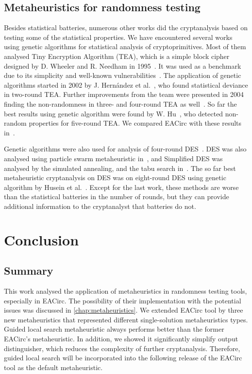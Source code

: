 \documentclass[
    digital,    %
    oneside,    %
    color,
    11pt,
    nocover,
    notable,
    nolof,
    nolot,
]{fithesis3}
\begin{document}
\section{Metaheuristics for randomness testing}
\label{sec:relatwork-paper}

Besides statistical batteries, numerous other works did the cryptanalysis based on testing some of the statistical properties. We have encountered several works using genetic algorithms for statistical analysis of cryptoprimitives. Most of them analysed Tiny Encryption Algorithm (TEA), which is a simple block cipher designed by D. Wheeler and R. Needham in 1995~\cite{TEA}. It was used as a benchmark due to its simplicity and well-known vulnerabilities~\cite{TEAAttack}. The application of genetic algorithms started in 2002 by J. Hernández et al.~\cite{twoRoundsTea}, who found statistical deviance in two-round TEA. Further improvements from the team were presented in 2004 finding the non-randomness in three- and four-round TEA as well~\cite{fourRoundsTea}. So far the best results using genetic algorithm were found by W. Hu~\cite{fiveRoundsTea}, who detected non-random properties for five-round TEA. We compared EACirc with these results in~\cite{kubicek2016new}.

Genetic algorithms were also used for analysis of four-round DES~\cite{song2007cryptanalysis}. DES was also analysed using particle swarm metaheuristic in~\cite{shahzad2009cryptanalysis}, and Simplified DES was analysed by the simulated annealing, and the tabu search in~\cite{nalini2005cryptanalysis}. The so far best metaheuristic cryptanalysis on DES was on eight-round DES using genetic algorithm by Husein et al.~\cite{husein2007genetic}. Except for the last work, these methods are worse than the statistical batteries in the number of rounds, but they can provide additional information to the cryptanalyst that batteries do not.


\chapter{Conclusion}
\label{chap:conclusion}

\section{Summary}
\label{sec:conclusion-summary}

This work analysed the application of metaheuristics in randomness testing tools, especially in EACirc. The possibility of their implementation with the potential issues was discussed in \cref{chap:metaheuristics}. We extended EACirc tool by three new metaheuristics that represented different single-solution metaheuristics types. Guided local search metaheuristic always performs better than the former EACirc's metaheuristic. In addition, we showed it significantly simplify output distinguisher, which reduces the complexity of further cryptanalysis. Therefore, guided local search will be incorporated into the following release of the EACirc tool as the default metaheuristic.
\end{document}

